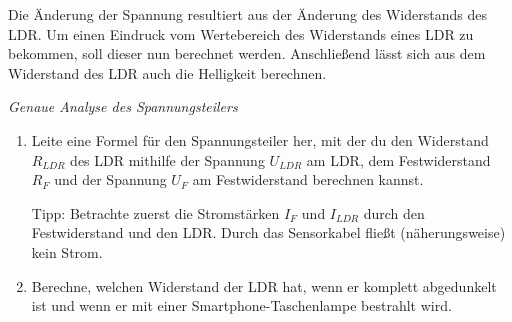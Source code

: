 Die Änderung der Spannung resultiert aus der Änderung des Widerstands des LDR. Um einen Eindruck vom Wertebereich des Widerstands eines LDR zu bekommen, soll dieser nun berechnet werden. Anschließend lässt sich aus dem Widerstand des LDR auch die Helligkeit berechnen.

\begin{aufgabe} \emph{Genaue Analyse des Spannungsteilers}
	\vspace{-0.3\baselineskip}
	\begin{enumerate}[label=\alph*), itemsep=0ex, parsep=0mm]
		\item Leite eine Formel für den Spannungsteiler her, mit der du den Widerstand $R_{LDR}$ des LDR mithilfe der Spannung $U_{LDR}$ am LDR, dem Festwiderstand $R_F$ und der Spannung $U_F$ am Festwiderstand berechnen kannst.
		
		Tipp: Betrachte zuerst die Stromstärken $I_F$ und $I_{LDR}$ durch den Festwiderstand und den LDR. Durch das Sensorkabel fließt (näherungsweise) kein Strom.
		\item Berechne, welchen Widerstand der LDR hat, wenn er komplett abgedunkelt ist und wenn er mit einer Smartphone-Taschenlampe bestrahlt wird.
	\end{enumerate}
\end{aufgabe}

